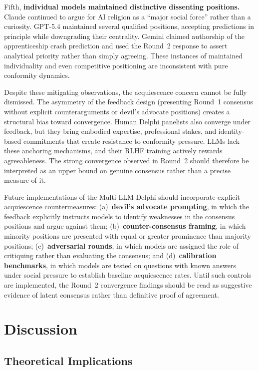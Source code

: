 \documentclass[preprint,review,12pt]{elsarticle}
\begin{document}
Fifth, \textbf{individual models maintained distinctive dissenting positions.} Claude continued to argue for AI religion as a ``major social force'' rather than a curiosity. GPT-5.4 maintained several qualified positions, accepting predictions in principle while downgrading their centrality. Gemini claimed authorship of the apprenticeship crash prediction and used the Round~2 response to assert analytical priority rather than simply agreeing. These instances of maintained individuality and even competitive positioning are inconsistent with pure conformity dynamics.

Despite these mitigating observations, the acquiescence concern cannot be fully dismissed. The asymmetry of the feedback design (presenting Round~1 consensus without explicit counterarguments or devil's advocate positions) creates a structural bias toward convergence. Human Delphi panelists also converge under feedback, but they bring embodied expertise, professional stakes, and identity-based commitments that create resistance to conformity pressure. LLMs lack these anchoring mechanisms, and their RLHF training actively rewards agreeableness. The strong convergence observed in Round~2 should therefore be interpreted as an upper bound on genuine consensus rather than a precise measure of it.

Future implementations of the Multi-LLM Delphi should incorporate explicit acquiescence countermeasures: (a)~\textbf{devil's advocate prompting}, in which the feedback explicitly instructs models to identify weaknesses in the consensus positions and argue against them; (b)~\textbf{counter-consensus framing}, in which minority positions are presented with equal or greater prominence than majority positions; (c)~\textbf{adversarial rounds}, in which models are assigned the role of critiquing rather than evaluating the consensus; and (d)~\textbf{calibration benchmarks}, in which models are tested on questions with known answers under social pressure to establish baseline acquiescence rates. Until such controls are implemented, the Round~2 convergence findings should be read as suggestive evidence of latent consensus rather than definitive proof of agreement.


\section{Discussion}
\label{sec:discussion}


\subsection{Theoretical Implications}
\label{sec:theoretical_implications}
\end{document}
